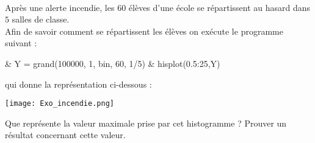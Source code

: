 \documentclass[11pt]{article}%
\begin{document}
\begin{exerciceSP}~\\
  Après une alerte incendie, les $60$ élèves d'une école se
  répartissent au hasard dans $5$ salles de classe.\\
  Afin de savoir comment se répartissent les élèves on exécute le
  programme \Scilab{} suivant :

  \begin{scilab}
    & Y = grand(100000, 1, \ttq{}bin\ttq{}, 60, 1/5) \nl %
    & hisplot(0.5:25,Y) \nl %
  \end{scilab}
  qui donne la représentation ci-dessous :

  \begin{center}
    \texttt{[image: Exo\_incendie.png]}
  \end{center}
  Que représente la valeur maximale prise par cet histogramme ?
  Prouver un résultat concernant cette valeur.
\end{exerciceSP}


\newpage
\end{document}
